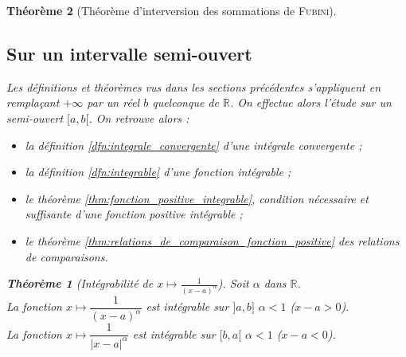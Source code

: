 \documentclass[11pt,a4paper]{report}
\newtheorem{theorem}{Théorème}[chapter]
\newtheorem{itheorem}[theorem]{Théorème}
\theoremstyle{definition}
\begin{document}
\begin{theorem}[Théorème d'interversion des sommations de \textsc{Fubini}]
\subsection{Sur un intervalle semi-ouvert} %
\label{sub:sur_un_intervalle_semi_ouvert}
Les définitions et théorèmes vus dans les sections précédentes s'appliquent en remplaçant $+\infty$ par un réel $b$ quelconque de \ensuremath{\mathbb{R}}. On effectue alors l'étude sur un semi-ouvert $[a,b[$. On retrouve alors : 
\begin{itemize}[label=$-$]
    \item la définition \ref{dfn:integrale_convergente} d'une intégrale convergente ;
    \item la définition \ref{dfn:integrable} d'une fonction intégrable ;
    \item le théorème \ref{thm:fonction_positive_integrable}, condition nécessaire et suffisante d'une fonction positive intégrable ;
    \item le théorème \ref{thm:relations_de_comparaison_fonction_positive} des relations de comparaisons.
\end{itemize}
\begin{itheorem}[Intégrabilité de $x\mapsto \frac{1}{(x-a)^\alpha}$]
     Soit $\alpha$ dans \ensuremath{\mathbb{R}}.\\
     La fonction $x \longmapsto \dfrac{1}{(x-a)^\alpha}$ est intégrable sur $]a,b]$ \Longleftrightarrow $\alpha < 1$ ($x-a > 0$). \\
     La fonction $x \mapsto \dfrac{1}{|x-a|^\alpha}$ est intégrable sur $[b,a[$ \Longleftrightarrow $\alpha < 1$ \newline ($x-a < 0$).
\end{itheorem}


\end{theorem}
\end{document}
